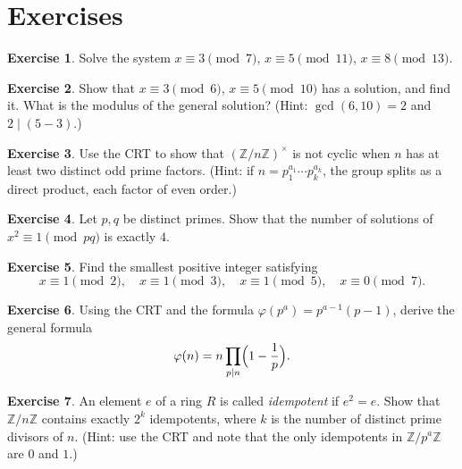 \documentclass[12pt,a4paper,openany]{book}
\theoremstyle{definition}
\newtheorem{exercise}{Exercise}[chapter]
\theoremstyle{plain}
\theoremstyle{remark}
\newcommand{\Z}{\mathbb{Z}}
\begin{document}
\section{Exercises}
\label{sec:crt-exercises}

\begin{exercise}
\label{exer:crt-basic}
Solve the system $x \equiv 3 \pmod{7}$, $x \equiv 5 \pmod{11}$, $x \equiv 8 \pmod{13}$.
\end{exercise}

\begin{exercise}
\label{exer:crt-non-coprime}
Show that $x \equiv 3 \pmod{6}$, $x \equiv 5 \pmod{10}$ has a solution,
and find it. What is the modulus of the general solution?
\textup{(}Hint: $\gcd(6,10) = 2$ and $2 \mid (5-3)$.\textup{)}
\end{exercise}

\begin{exercise}
\label{exer:crt-units}
Use the CRT to show that $(\Z/n\Z)^\times$ is not cyclic when
$n$ has at least two distinct odd prime factors.
\textup{(}Hint: if $n = p_1^{a_1} \cdots p_k^{a_k}$, the group splits as a
direct product, each factor of even order.\textup{)}
\end{exercise}

\begin{exercise}
\label{exer:crt-polynomial}
Let $p, q$ be distinct primes. Show that the number of solutions of $x^2 \equiv 1 \pmod{pq}$
is exactly $4$.
\end{exercise}

\begin{exercise}
\label{exer:crt-simultaneous-prime}
Find the smallest positive integer satisfying
\[
  x \equiv 1 \pmod{2}, \quad x \equiv 1 \pmod{3}, \quad x \equiv 1 \pmod{5},
  \quad x \equiv 0 \pmod{7}.
\]
\end{exercise}

\begin{exercise}
\label{exer:crt-totient}
Using the CRT and the formula $\varphi(p^a) = p^{a-1}(p-1)$, derive the general
formula
\[
  \varphi(n) = n \prod_{p \mid n} \Bigl(1 - \frac{1}{p}\Bigr).
\]
\end{exercise}

\begin{exercise}
\label{exer:crt-idempotents}
An element $e$ of a ring $R$ is called \emph{idempotent} if $e^2 = e$.
Show that $\Z/n\Z$ contains exactly $2^k$ idempotents, where $k$ is the
number of distinct prime divisors of $n$.
\textup{(}Hint: use the CRT and note that the only idempotents in $\Z/p^a\Z$
are $0$ and $1$.\textup{)}
\end{exercise}
\end{document}
